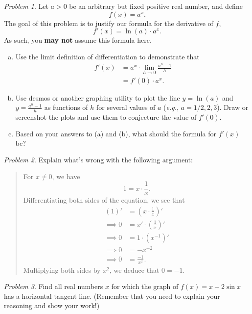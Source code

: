 \documentclass[11pt,twoside]{amsart}
\theoremstyle{plain}
\theoremstyle{remark}
\newtheorem{prob}{Problem}
\theoremstyle{definition}
\theoremstyle{definition}
\begin{document}
\begin{prob}
Let $a>0$ be an arbitrary but fixed positive real number, and define
\[
  f(x) = a^x.
\]
The goal of this problem is to justify our formula for the derivative of $f$,
\[
  f'(x) = \ln(a)\cdot a^x.
\]
As such, you \textbf{may not} assume this formula here.
\begin{enumerate}[(a)]
\item Use the limit definition of differentiation to demonstrate that
\[
\begin{aligned}
  f'(x) &= a^x\cdot \lim_{h\to 0}\frac{a^h-1}{h}\\
  &= f'(0)\cdot a^x.
\end{aligned}
\]
\item Use desmos or another graphing utility to plot the line $y=\ln(a)$ and $y=\frac{a^h-1}{h}$ as functions of $h$ for several values of $a$ (\emph{e.g.}, $a=1/2,2,3$). Draw or screenshot the plots and use them to conjecture the value of $f'(0)$.
\item Based on your answers to (a) and (b), what should the formula for $f'(x)$ be?
\end{enumerate}
\end{prob}

\begin{prob}
Explain what's wrong with the following argument:
\begin{quote}
  For $x\ne 0$, we have
  \[
    1 = x\cdot \frac 1x.
  \]
  Differentiating both sides of the equation, we see that
  \[
  \begin{aligned}
    (1)' &= \left(x\cdot\frac 1x\right)'\\
    \implies 0 &= x'\cdot \left(\frac 1x\right)'\\
    \implies 0 &= 1\cdot (x^{-1})'\\
    \implies 0 &= -x^{-2}\\
    \implies 0 &= \frac{-1}{x^2}.
  \end{aligned}
  \]
  Multiplying both sides by $x^2$, we deduce that $0=-1$.
\end{quote}
\end{prob}

\begin{prob}
Find all real numbers $x$ for which the graph of $f(x) = x+2\sin x$ has a horizontal tangent line. (Remember that you need to explain your reasoning and show your work!)
\end{prob}
\end{document}
